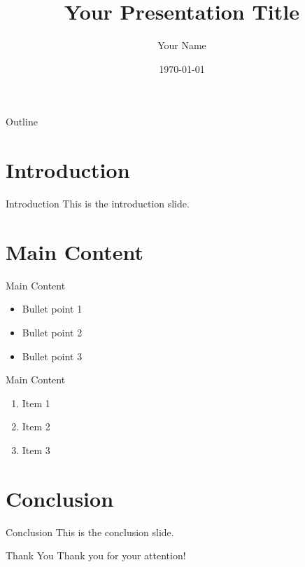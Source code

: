 \documentclass{beamer}
\title{Your Presentation Title}
\author{Your Name}
\date{\today}
\begin{document}
\begin{frame}
  \titlepage
\end{frame}

\begin{frame}{Outline}
  \tableofcontents
\end{frame}

\section{Introduction}

\begin{frame}{Introduction}
  This is the introduction slide.
\end{frame}

\section{Main Content}

\begin{frame}{Main Content}
  \begin{itemize}
    \item Bullet point 1
    \item Bullet point 2
    \item Bullet point 3
  \end{itemize}
\end{frame}

\begin{frame}{Main Content}
  \begin{enumerate}
    \item Item 1
    \item Item 2
    \item Item 3
  \end{enumerate}
\end{frame}

\section{Conclusion}

\begin{frame}{Conclusion}
  This is the conclusion slide.
\end{frame}

\begin{frame}{Thank You}
  \centering
  \Huge Thank you for your attention!
\end{frame}
\end{document}
